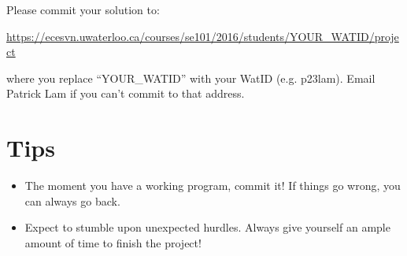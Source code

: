 \documentclass{article}
\begin{document}
Please commit your solution to:

\begin{center}
\url{https://ecesvn.uwaterloo.ca/courses/se101/2016/students/YOUR\_WATID/project}
\end{center}

where you replace ``YOUR\_WATID'' with your WatID (e.g. p23lam). Email Patrick Lam if you can't commit to that address.

\section*{Tips}
\begin{itemize}
	\item The moment you have a working program, commit it! If things go wrong, you can always go back.
	\item Expect to stumble upon unexpected hurdles.  Always give yourself an ample amount of time to finish the project!	
\end{itemize}

\begin{flushleft}
\begin{thebibliography}{1}

\end{thebibliography}
\end{flushleft}
\end{document}
